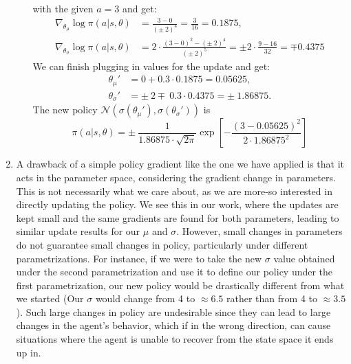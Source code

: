 \documentclass{article}
\begin{document}
\begin{enumerate}
\begin{enumerate}
		            with the given $a=3$ and get:
		            \begin{align*}
			            \nabla_{\theta_\mu} \log \pi(a|s, \theta)    & = \frac{3-0}{(\pm~2)^4}
			            = \frac{3}{16} = 0.1875,                                               \\
			            \nabla_{\theta_\sigma} \log \pi(a|s, \theta) & = 2 \cdot \frac{
				            (3-0)^2-(\pm~2)^4 }{(\pm ~2)^5} = \pm 2 \cdot \frac{9 - 16}{32} = \mp 0.4375
		            \end{align*}
		            We can finish plugging in values for the update and get:
		            \begin{align}
			            \theta_\mu'    & =  0 + 0.3 \cdot 0.1875 = 0.05625,              \\
			            \theta_\sigma' & =  \pm~ 2 \mp~ 0.3 \cdot 0.4375 = \pm~ 1.86875.
		            \end{align}
		            The new policy $\mathcal{N}(\sigma(\theta_\mu'), \sigma(\theta_\sigma'))$ is
		            \begin{equation}
			            \pi(a|s, \theta) = \pm~ \frac{1}{1.86875 \cdot \sqrt{2 \pi}}\exp\left[-\frac{(3
					            - 0.05625)^2}{2 \cdot 1.86875^2}\right]
		            \end{equation}
	      \end{enumerate}
	\item A drawback of a simple policy gradient like the one we have applied is that it acts in the
	      parameter space, considering the gradient change in parameters. This is not necessarily what
	      we care about, as we are more-so interested in directly updating the policy. We see this in
	      our work, where the updates are kept small and the same gradients are found for both parameters,
	      leading to similar update results for our $\mu$ and $\sigma$. However, small changes in
	      parameters do not guarantee small changes in policy, particularly under different
	      parametrizations. For instance, if we were to take the new $\sigma$ value obtained under the
	      second parametrization and use it to define our policy under the first parametrization, our
	      new policy would be drastically different from what we started (Our $\sigma$ would change from
	      4 to $\approx 6.5$ rather than from 4 to $\approx 3.5$). Such large changes in policy are
	      undesirable since they can lead to large changes in the agent's behavior, which if in the
	      wrong direction, can cause situations where the agent is unable to recover from the state
	      space it ends up in.
\end{enumerate}
\end{document}
